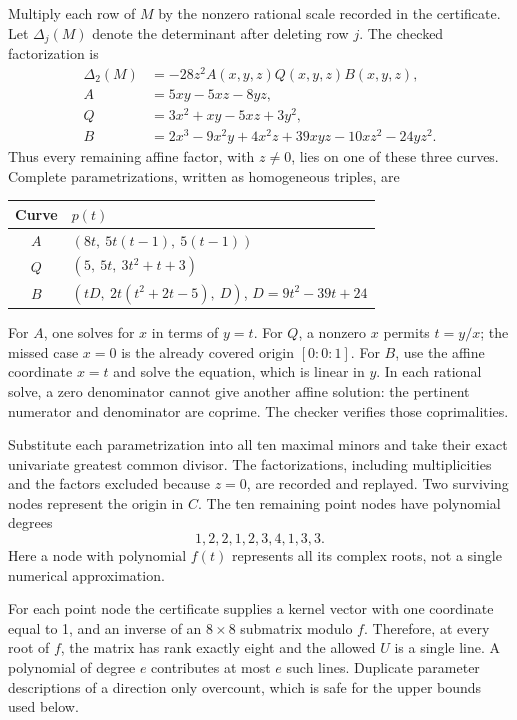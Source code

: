 \documentclass[11pt]{article}
\theoremstyle{definition}\newtheorem{definition}[theorem]{Definition}
\begin{document}
Multiply each row of $M$ by the nonzero rational scale recorded in the certificate. Let $\Delta_j(M)$ denote the determinant after deleting row $j$. The checked factorization is
\begin{align}\label{eq:Aleftfactor}
\Delta_2(M)&=-28z^2 A(x,y,z)Q(x,y,z)B(x,y,z),\\
A&=5xy-5xz-8yz,\nonumber\\
Q&=3x^2+xy-5xz+3y^2,\nonumber\\
B&=2x^3-9x^2y+4x^2z+39xyz-10xz^2-24yz^2.\nonumber
\end{align}
Thus every remaining affine factor, with $z\ne0$, lies on one of these three curves. Complete parametrizations, written as homogeneous triples, are
\begin{center}
\begin{tabular}{@{}cl@{}}\toprule
Curve & $p(t)$ \\\midrule
$A$ & $(8t,\ 5t(t-1),\ 5(t-1))$\\
$Q$ & $(5,\ 5t,\ 3t^2+t+3)$\\
$B$ & $(tD,\ 2t(t^2+2t-5),\ D)$, $D=9t^2-39t+24$\\\bottomrule
\end{tabular}
\end{center}
For $A$, one solves for $x$ in terms of $y=t$. For $Q$, a nonzero $x$ permits $t=y/x$; the missed case $x=0$ is the already covered origin $[0:0:1]$. For $B$, use the affine coordinate $x=t$ and solve the equation, which is linear in $y$. In each rational solve, a zero denominator cannot give another affine solution: the pertinent numerator and denominator are coprime. The checker verifies those coprimalities.

Substitute each parametrization into all ten maximal minors and take their exact univariate greatest common divisor. The factorizations, including multiplicities and the factors excluded because $z=0$, are recorded and replayed. Two surviving nodes represent the origin in $C$. The ten remaining point nodes have polynomial degrees
\begin{equation}\label{eq:Adegrees}
1,2,2,1,2,3,4,1,3,3.
\end{equation}
Here a node with polynomial $f(t)$ represents all its complex roots, not a single numerical approximation.

For each point node the certificate supplies a kernel vector with one coordinate equal to 1, and an inverse of an $8\times8$ submatrix modulo $f$. Therefore, at every root of $f$, the matrix has rank exactly eight and the allowed $U$ is a single line. A polynomial of degree $e$ contributes at most $e$ such lines. Duplicate parameter descriptions of a direction only overcount, which is safe for the upper bounds used below.
\end{document}
